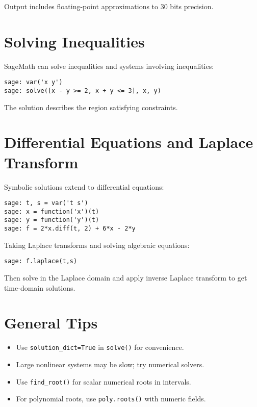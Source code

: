 \documentclass[12pt]{book}
\begin{document}
Output includes floating-point approximations to 30 bits precision.

\section{Solving Inequalities}

SageMath can solve inequalities and systems involving inequalities:

\begin{verbatim}
sage: var('x y')
sage: solve([x - y >= 2, x + y <= 3], x, y)
\end{verbatim}

The solution describes the region satisfying constraints.

\section{Differential Equations and Laplace Transform}

Symbolic solutions extend to differential equations:

\begin{verbatim}
sage: t, s = var('t s')
sage: x = function('x')(t)
sage: y = function('y')(t)
sage: f = 2*x.diff(t, 2) + 6*x - 2*y
\end{verbatim}

Taking Laplace transforms and solving algebraic equations:

\begin{verbatim}
sage: f.laplace(t,s)
\end{verbatim}

Then solve in the Laplace domain and apply inverse Laplace transform to get time-domain solutions.

\section{General Tips}

\begin{itemize}
  \item Use \texttt{solution\_dict=True} in \texttt{solve()} for convenience.
  \item Large nonlinear systems may be slow; try numerical solvers.
  \item Use \texttt{find\_root()} for scalar numerical roots in intervals.
  \item For polynomial roots, use \texttt{poly.roots()} with numeric fields.
\end{itemize}
\end{document}
